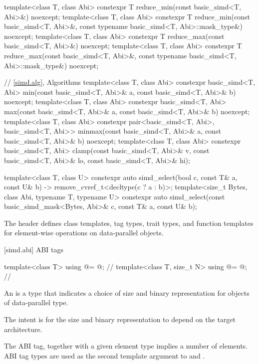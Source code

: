 \begin{codeblock}
{  template<class T, class Abi>
    constexpr T reduce_min(const basic_simd<T, Abi>&) noexcept;
  template<class T, class Abi>
    constexpr T reduce_min(const basic_simd<T, Abi>&, const typename basic_simd<T, Abi>::mask_type&) noexcept;
  template<class T, class Abi>
    constexpr T reduce_max(const basic_simd<T, Abi>&) noexcept;
  template<class T, class Abi>
    constexpr T reduce_max(const basic_simd<T, Abi>&, const typename basic_simd<T, Abi>::mask_type&) noexcept;

  // \ref{simd.alg}, Algorithms
  template<class T, class Abi>
    constexpr basic_simd<T, Abi>
      min(const basic_simd<T, Abi>& a, const basic_simd<T, Abi>& b) noexcept;
  template<class T, class Abi>
    constexpr basic_simd<T, Abi>
      max(const basic_simd<T, Abi>& a, const basic_simd<T, Abi>& b) noexcept;
  template<class T, class Abi>
    constexpr pair<basic_simd<T, Abi>, basic_simd<T, Abi>>
      minmax(const basic_simd<T, Abi>& a, const basic_simd<T, Abi>& b) noexcept;
  template<class T, class Abi>
    constexpr basic_simd<T, Abi>
      clamp(const basic_simd<T, Abi>& v,
            const basic_simd<T, Abi>& lo,
            const basic_simd<T, Abi>& hi);

  template<class T, class U>
    constexpr auto simd_select(bool c, const T& a, const U& b) -> remove_cvref_t<decltype(c ? a : b)>;
  template<size_t Bytes, class Abi, typename T, typename U>
    constexpr auto simd_select(const basic_simd_mask<Bytes, Abi>& c, const T& a, const U& b);
}
\end{codeblock}

\pnum
The header  defines class templates, tag types, trait types, and function templates for element-wise operations on data-parallel objects.

[simd.abi]{ ABI tags}

\begin{codeblock}
template<class T> using @\nativeabi@ = @\seebelow@; // \expos
template<class T, size_t N> using @\deducet@ = @\seebelow@; // \expos
\end{codeblock}

\pnum
An  is a type that indicates a choice of size and binary
representation for objects of data-parallel type.
\begin{note}
  The intent is for the size and binary representation to depend on the target
  architecture.
\end{note}
The ABI tag, together with a given element type implies a number of elements.
ABI tag types are used as the second template argument to 
and .

